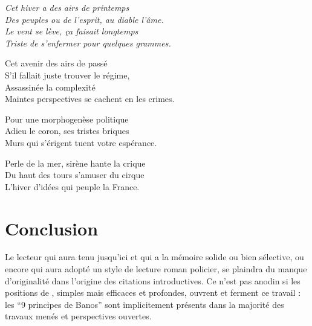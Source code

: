 




\raggedleft
\textit{
Cet hiver a des airs de printemps\\
Des peuples ou de l'esprit, au diable l'âme.\\
Le vent se lève, ça faisait longtemps\\
Triste de s'enfermer pour quelques grammes.\\
}

\medskip

\raggedright

Cet avenir des airs de passé\\
S'il fallait juste trouver le régime,\\
Assassinée la complexité\\
Maintes perspectives se cachent en les crimes.\\

\medskip
\raggedleft

Pour une morphogenèse politique\\
Adieu le coron, ses tristes briques\\
Murs qui s'érigent tuent votre espérance.\\

\medskip
\raggedright

Perle de la mer, sirène hante la crique\\
Du haut des tours s'amuser du cirque\\
L'hiver d'idées qui peuple la France.\\






\newpage






\chapter*{Conclusion}







Le lecteur qui aura tenu jusqu'ici et qui a la mémoire solide ou bien sélective, ou encore qui aura adopté un style de lecture roman policier, se plaindra du manque d'originalité dans l'origine des citations introductives. Ce n'est pas anodin si les positions de , simples mais efficaces et profondes, ouvrent et ferment ce travail : les ``9 principes de Banos'' sont implicitement présents dans la majorité des travaux menés et perspectives ouvertes. 


